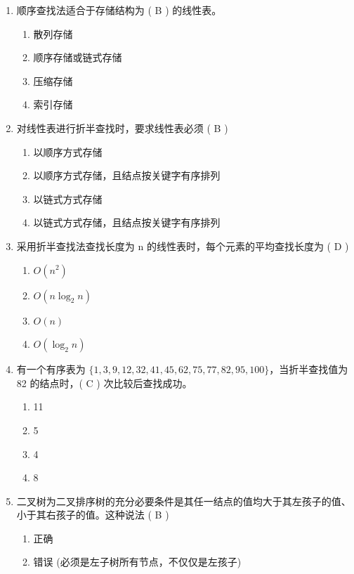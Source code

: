 \documentclass[12pt, a4paper]{article}
\begin{document}
\begin{enumerate}[label=\arabic*.]
    \item 顺序查找法适合于存储结构为 ( B ) 的线性表。
    \begin{enumerate}
        \item 散列存储
        \item 顺序存储或链式存储
        \item 压缩存储
        \item 索引存储
    \end{enumerate}

    \item 对线性表进行折半查找时，要求线性表必须 ( B )
    \begin{enumerate}
        \item 以顺序方式存储
        \item 以顺序方式存储，且结点按关键字有序排列
        \item 以链式方式存储
        \item 以链式方式存储，且结点按关键字有序排列
    \end{enumerate}

    \item 采用折半查找法查找长度为 n 的线性表时，每个元素的平均查找长度为 ( D )
    \begin{enumerate}
        \item $O(n^2)$
        \item $O(n \log_2 n)$
        \item $O(n)$
        \item $O(\log_2 n)$
    \end{enumerate}

    \item 有一个有序表为 $\{1, 3, 9, 12, 32, 41, 45, 62, 75, 77, 82, 95, 100\}$，当折半查找值为 82 的结点时，( C ) 次比较后查找成功。
    \begin{enumerate}
        \item 11
        \item 5
        \item 4
        \item 8
    \end{enumerate}

    \item 二叉树为二叉排序树的充分必要条件是其任一结点的值均大于其左孩子的值、小于其右孩子的值。这种说法 ( B )
    \begin{enumerate}
        \item 正确
        \item 错误 (必须是左子树所有节点，不仅仅是左孩子)
    \end{enumerate}


\end{enumerate}
\end{document}
